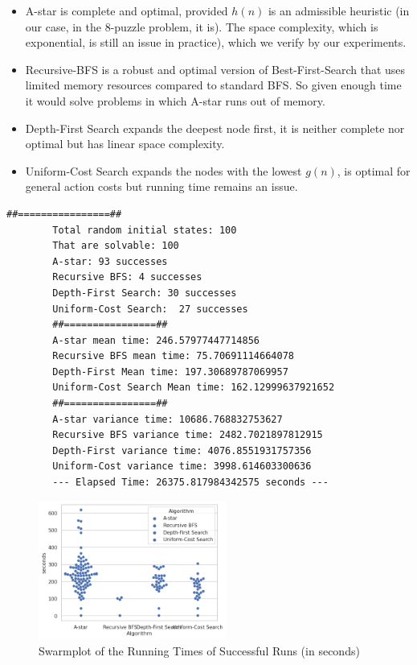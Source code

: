 \documentclass{article}
\begin{document}
	\begin{itemize}
		
		\item A-star is complete and optimal, provided $h(n)$ is an admissible heuristic (in our case, in the 8-puzzle problem, it is). The space complexity, which is exponential, is still an issue in practice), which we verify by our experiments.
		
		\item Recursive-BFS is a robust and optimal version of Best-First-Search that uses limited memory resources compared to standard BFS. So given enough time it would solve problems in which A-star runs out of memory.
		
		\item Depth-First Search expands the deepest node first, it is neither complete nor optimal but has linear space complexity.
		
		\item Uniform-Cost Search expands the nodes with the lowest $g(n)$, is optimal for general action costs but running time remains an issue.
	
	\end{itemize}
	 
	 \begin{lstlisting}[caption=Output of the 4 algorithms]
	 	##================##
	 	Total random initial states: 100
	 	That are solvable: 100
	 	A-star: 93 successes
	 	Recursive BFS: 4 successes
	 	Depth-First Search: 30 successes
	 	Uniform-Cost Search:  27 successes
	 	##================##
	 	A-star mean time: 246.57977447714856
	 	Recursive BFS mean time: 75.70691114664078
	 	Depth-First Mean time: 197.30689787069957
	 	Uniform-Cost Search Mean time: 162.12999637921652
	 	##================##
	 	A-star variance time: 10686.768832753627
	 	Recursive BFS variance time: 2482.7021897812915
	 	Depth-First variance time: 4076.8551931757356
	 	Uniform-Cost variance time: 3998.614603300636
	 	--- Elapsed Time: 26375.817984342575 seconds ---
	 \end{lstlisting}
	\begin{figure}[h]
		\centering
		\includegraphics[width=0.55\textwidth]{images/img2.png}
		\caption{Swarmplot of the Running Times of Successful Runs (in seconds)}
	\end{figure}
\end{document}
